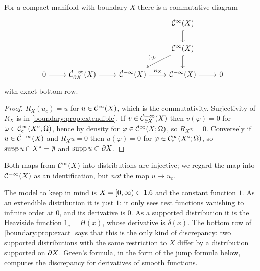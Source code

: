 \begin{proposition}\label{boundary:prop:exact}
For a compact manifold with boundary $X$ there is a commutative diagram
\begin{equation*}
\begin{tikzcd}
& & & \dCI(X)\arrow[d,hook] & \\
& & & \CI(X)\arrow[d,hook]\arrow[dl,"(\cdot)_c"'] & \\
0\arrow[r] & \dCmI_{\pa X}(X)\arrow[r] & \dCmI(X)\arrow[r,"R_X"] & \CmI(X)\arrow[r] & 0
\end{tikzcd}
\end{equation*}
with exact bottom row.
\end{proposition}
\begin{proof}
$R_X(u_c)=u$ for $u\in\mathcal{C}^\infty(X)$, which is the commutativity. Surjectivity of $R_X$ is
in \cref{boundary:prop:extendible}. If $v\in\dot{\mathcal{C}}^{-\infty}_{\partial X}(X)$ then $v(\varphi)=0$ for
$\varphi\in\mathcal{C}^\infty_{\mathrm{c}}(X^\circ;\Omega)$, hence by density for $\varphi\in\dot{\mathcal{C}}^\infty(X;\Omega)$, so
$R_Xv=0$. Conversely if $u\in\dot{\mathcal{C}}^{-\infty}(X)$ and $R_Xu=0$ then $u(\varphi)=0$ for
$\varphi\in\mathcal{C}^\infty_{\mathrm{c}}(X^\circ;\Omega)$, so $\operatorname{supp} u\cap X^\circ=\emptyset$ and $\operatorname{supp} u
\subset\partial X$.
\end{proof}

Both maps from $\mathcal{C}^\infty(X)$ into distributions are injective; we regard the map into
$\mathcal{C}^{-\infty}(X)$ as an identification, but \emph{not} the map $u\mapsto u_c$.

\begin{discussion}
The model to keep in mind is $X=[0,\infty)\subset1.6$ and the constant function $1$.
As an extendible distribution it is just $1$: it only sees test functions vanishing
to infinite order at $0$, and its derivative is $0$. As a supported distribution it is
the Heaviside function $1_c=H(x)$, whose derivative is $\delta(x)$. The bottom row of
\cref{boundary:prop:exact} says that this is the only kind of discrepancy: two
supported distributions with the same restriction to $X$ differ by a distribution
supported on $\partial X$. Green's formula, in the form of the jump formula below, computes
the discrepancy for derivatives of smooth functions.
\end{discussion}

